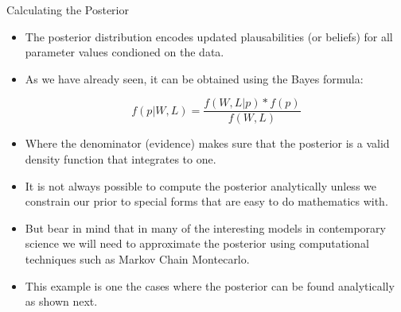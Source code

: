\documentclass[handout]{beamer}
\begin{document}
\begin{frame}{Calculating the Posterior}
\scriptsize{

\begin{itemize}

\item The posterior distribution encodes updated plausabilities (or beliefs) for all parameter values condioned on the data.
\item As we have already seen, it can be obtained using the Bayes formula:

\begin{displaymath}
 f(p|W,L) = \frac{f(W,L|p)* f(p)}{f(W,L)}
\end{displaymath}

\item Where the denominator (evidence) makes sure that the posterior is a valid density function that integrates to one.

\item It is not always possible to compute the posterior analytically unless we constrain our prior to special forms that are easy to do mathematics with.

\item But bear in mind that in many of the interesting models in contemporary science we will need to approximate the posterior using computational techniques such as Markov Chain Montecarlo. 

\item This example is one the cases where the posterior can be found analytically as shown next.

\end{itemize}

} 


\end{frame}
\end{document}
